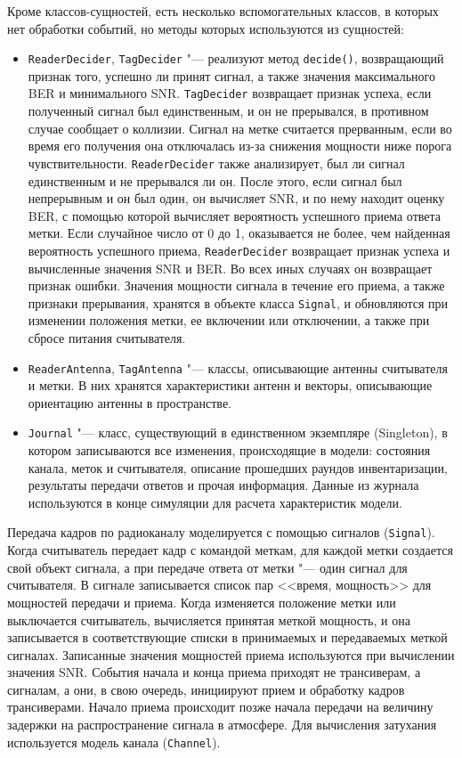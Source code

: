Кроме классов-сущностей, есть несколько вспомогательных классов, в которых нет обработки событий, но методы которых используются из сущностей:

\begin{itemize}
	\item \texttt{ReaderDecider}, \texttt{TagDecider} "--- реализуют метод \texttt{decide()}, возвращающий признак того, успешно ли принят сигнал, а также значения максимального BER и минимального SNR. \texttt{TagDecider} возвращает признак успеха, если полученный сигнал был единственным, и он не прерывался, в противном случае сообщает о коллизии. Сигнал на метке считается прерванным, если во время его получения она отключалась из-за снижения мощности ниже порога чувствительности. \texttt{ReaderDecider} также анализирует, был ли сигнал единственным и не прерывался ли он. После этого, если сигнал был непрерывным и он был один, он вычисляет SNR, и по нему находит оценку BER, с помощью которой вычисляет вероятность успешного приема ответа метки. Если случайное число от 0 до 1, оказывается не более, чем найденная вероятность успешного приема, \texttt{ReaderDecider} возвращает признак успеха и вычисленные значения SNR и BER. Во всех иных случаях он возвращает признак ошибки. Значения мощности сигнала в течение его приема, а также признаки прерывания, хранятся в объекте класса \texttt{Signal}, и обновляются при изменении положения метки, ее включении или отключении, а также при сбросе питания считывателя.
	\item \texttt{ReaderAntenna}, \texttt{TagAntenna} "--- классы, описывающие антенны считывателя и метки. В них хранятся характеристики антенн и векторы, описывающие ориентацию антенны в пространстве.
	\item \texttt{Journal} "--- класс, существующий в единственном экземпляре (Singleton), в котором записываются все изменения, происходящие в модели: состояния канала, меток и считывателя, описание прошедших раундов инвентаризации, результаты передачи ответов и прочая информация. Данные из журнала используются в конце симуляции для расчета характеристик модели.
\end{itemize}

Передача кадров по радиоканалу моделируется с помощью сигналов (\texttt{Signal}). Когда считыватель передает кадр с командой меткам, для каждой метки создается свой объект сигнала, а при передаче ответа от метки "--- один сигнал для считывателя. В сигнале записывается список пар <<время, мощность>> для мощностей передачи и приема. Когда изменяется положение метки или выключается считыватель, вычисляется принятая меткой мощность, и она записывается в соответствующие списки в принимаемых и передаваемых меткой сигналах. Записанные значения мощностей приема используются при вычислении значения SNR. События начала и конца приема приходят не трансиверам, а сигналам, а они, в свою очередь, инициируют прием и обработку кадров трансиверами. Начало приема происходит позже начала передачи на величину задержки на распространение сигнала в атмосфере. Для вычисления затухания используется модель канала (\texttt{Channel}).

